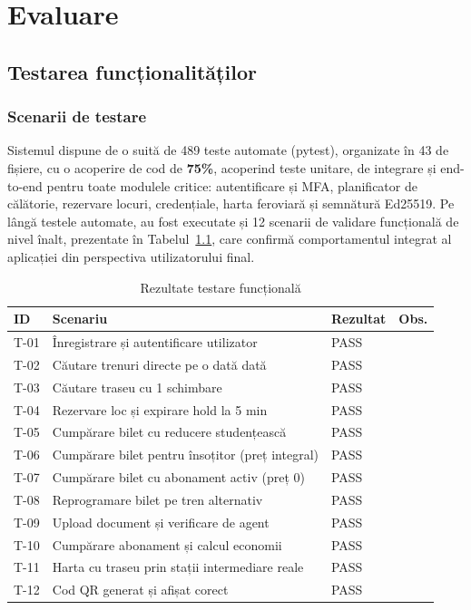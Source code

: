 \documentclass[12pt,a4paper]{report}
\begin{document}
\chapter{Evaluare}

\section{Testarea funcționalităților}

\subsection{Scenarii de testare}

Sistemul dispune de o suită de 489 teste automate (pytest), organizate în 43 de fișiere, cu o acoperire de cod de \textbf{75\%}, acoperind teste unitare, de integrare și end-to-end pentru toate modulele critice: autentificare și MFA, planificator de călătorie, rezervare locuri, credențiale, harta feroviară și semnătură Ed25519. Pe lângă testele automate, au fost executate și 12 scenarii de validare funcțională de nivel înalt, prezentate în Tabelul~\ref{tab:tests}, care confirmă comportamentul integrat al aplicației din perspectiva utilizatorului final.

\begin{table}[ht]\small\linespread{1}
\caption{Rezultate testare funcțională}
\label{tab:tests}
\begin{tabular}{l p{5.5cm} l l}
\textbf{ID} & \textbf{Scenariu} & \textbf{Rezultat} & \textbf{Obs.} \\\hline
T-01 & Înregistrare și autentificare utilizator & PASS & \\
T-02 & Căutare trenuri directe pe o dată dată & PASS & \\
T-03 & Căutare traseu cu 1 schimbare & PASS & \\
T-04 & Rezervare loc și expirare hold la 5 min & PASS & \\
T-05 & Cumpărare bilet cu reducere studențească & PASS & \\
T-06 & Cumpărare bilet pentru însoțitor (preț integral) & PASS & \\
T-07 & Cumpărare bilet cu abonament activ (preț 0) & PASS & \\
T-08 & Reprogramare bilet pe tren alternativ & PASS & \\
T-09 & Upload document și verificare de agent & PASS & \\
T-10 & Cumpărare abonament și calcul economii & PASS & \\
T-11 & Harta cu traseu prin stații intermediare reale & PASS & \\
T-12 & Cod QR generat și afișat corect & PASS & \\
\hline
\end{tabular}
\end{table}
\end{document}
